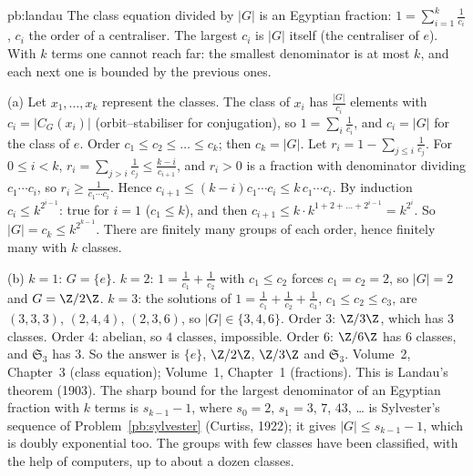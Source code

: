 \begin{solution}{pb:landau}
\idea The class equation divided by $|G|$ is an Egyptian fraction: $1=\sum_{i=1}^k\frac1{c_i}$, $c_i$ the order of a
centraliser. The largest $c_i$ is $|G|$ itself (the centraliser of $e$). With $k$ terms one cannot reach far: the smallest
denominator is at most $k$, and each next one is bounded by the previous ones.

\writeup (a) Let $x_1,\dots,x_k$ represent the classes. The class of $x_i$ has $\frac{|G|}{c_i}$ elements with
$c_i=|C_G(x_i)|$ (orbit--stabiliser for conjugation), so $1=\sum_i\frac1{c_i}$, and $c_i=|G|$ for the class of $e$. Order
$c_1\le c_2\le\dots\le c_k$; then $c_k=|G|$. Let $r_i=1-\sum_{j\le i}\frac1{c_j}$. For $0\le i<k$, $r_i=\sum_{j>i}\frac1{c_j}\le\frac{k-i}{c_{i+1}}$,
and $r_i>0$ is a fraction with denominator dividing $c_1\cdots c_i$, so $r_i\ge\frac1{c_1\cdots c_i}$. Hence
$c_{i+1}\le(k-i)c_1\cdots c_i\le k\,c_1\cdots c_i$. By induction $c_i\le k^{2^{i-1}}$: true for $i=1$ ($c_1\le k$), and then
$c_{i+1}\le k\cdot k^{1+2+\dots+2^{i-1}}=k^{2^i}$. So $|G|=c_k\le k^{2^{k-1}}$. There are finitely many groups of each order,
hence finitely many with $k$ classes.

(b) $k=1$: $G=\{e\}$. $k=2$: $1=\frac1{c_1}+\frac1{c_2}$ with $c_1\le c_2$ forces $c_1=c_2=2$, so $|G|=2$ and $G=\Z/2\Z$. $k=3$: the
solutions of $1=\frac1{c_1}+\frac1{c_2}+\frac1{c_3}$, $c_1\le c_2\le c_3$, are $(3,3,3)$, $(2,4,4)$, $(2,3,6)$, so $|G|\in\{3,4,6\}$.
Order $3$: $\Z/3\Z$, which has $3$ classes. Order $4$: abelian, so $4$ classes, impossible. Order $6$: $\Z/6\Z$ has $6$ classes,
and $\mathfrak S_3$ has $3$. So the answer is $\{e\}$, $\Z/2\Z$, $\Z/3\Z$ and $\mathfrak S_3$.
\tools Volume~2, Chapter~3 (class equation); Volume~1, Chapter~1 (fractions).
\leads This is Landau's theorem (1903). The sharp bound for the largest denominator of an Egyptian fraction with $k$ terms is
$s_{k-1}-1$, where $s_0=2$, $s_1=3$, $7$, $43$, \dots{} is Sylvester's sequence of Problem~\ref{pb:sylvester} (Curtiss, 1922); it gives
$|G|\le s_{k-1}-1$, which is doubly exponential too. The groups with few classes have been classified, with the help of computers, up
to about a dozen classes.
\end{solution}

